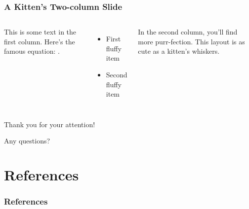 \begin{frame}
\frametitle{A Kitten's Two-column Slide}

\begin{columns}

This is some text in the first column. Here's the famous equation: .

\begin{itemize}
\item First fluffy item
\item Second fluffy item
\end{itemize}

In the second column, you'll find more purr-fection. This layout is as cute as a kitten's whiskers.
\end{columns}

\end{frame}



\begin{frame}
        \Large
        \begin{alertblock}{}
            \centering
            Thank you for your attention!
    
            Any questions?
        \end{alertblock}
\end{frame}


\section{References}

\begin{frame}
  \frametitle{References}
  \printbibliography %
\end{frame}

